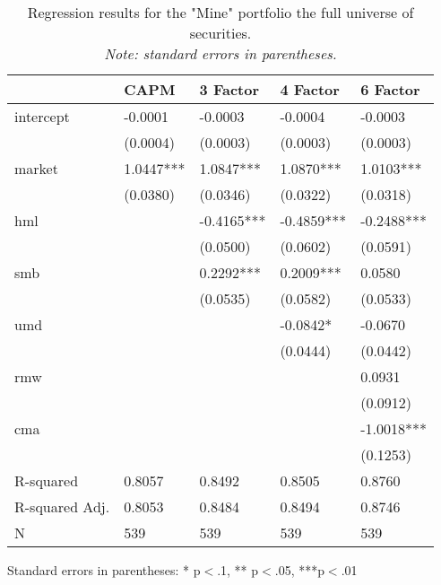 \begin{appendices}
\begin{table}
\caption{Regression results for the "Mine" portfolio the full universe of securities. \\ \textit{Note: standard errors in parentheses.}}
\label{tab:mine_all}
\begin{center}
\begin{tabular}{lllll}
               & CAPM      & 3 Factor   & 4 Factor   & 6 Factor    \\
\hline
intercept          & -0.0001   & -0.0003    & -0.0004    & -0.0003     \\
               & (0.0004)  & (0.0003)   & (0.0003)   & (0.0003)    \\
market           & 1.0447*** & 1.0847***  & 1.0870***  & 1.0103***   \\
               & (0.0380)  & (0.0346)   & (0.0322)   & (0.0318)    \\
hml            &           & -0.4165*** & -0.4859*** & -0.2488***  \\
               &           & (0.0500)   & (0.0602)   & (0.0591)    \\
smb            &           & 0.2292***  & 0.2009***  & 0.0580      \\
               &           & (0.0535)   & (0.0582)   & (0.0533)    \\
umd            &           &            & -0.0842*   & -0.0670     \\
               &           &            & (0.0444)   & (0.0442)    \\
rmw            &           &            &            & 0.0931      \\
               &           &            &            & (0.0912)    \\
cma            &           &            &            & -1.0018***  \\
               &           &            &            & (0.1253)    \\
R-squared      & 0.8057    & 0.8492     & 0.8505     & 0.8760      \\
R-squared Adj. & 0.8053    & 0.8484     & 0.8494     & 0.8746      \\
N              & 539       & 539        & 539        & 539         \\
\hline
\end{tabular}
\end{center}
{\footnotesize Standard errors in parentheses: * p$<$.1, ** p$<$.05, ***p$<$.01\par}
\end{table}


\end{appendices}
